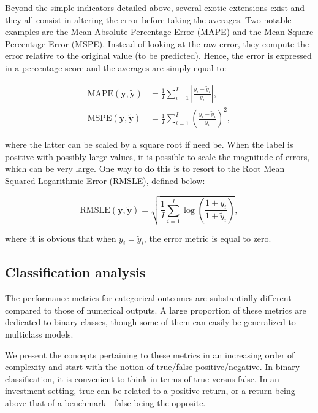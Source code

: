 \documentclass[]{krantz}
\theoremstyle{definition}
\theoremstyle{definition}
\theoremstyle{definition}
\theoremstyle{remark}
\begin{document}
Beyond the simple indicators detailed above, several exotic extensions
exist and they all consist in altering the error before taking the
averages. Two notable examples are the Mean Absolute Percentage Error
(MAPE) and the Mean Square Percentage Error (MSPE). Instead of looking
at the raw error, they compute the error relative to the original value
(to be predicted). Hence, the error is expressed in a percentage score
and the averages are simply equal to:

\begin{align} \label{eq:MAPE} 
\text{MAPE}(\textbf{y},\tilde{\textbf{y}})&=\frac{1}{I}\sum_{i=1}^I\left|\frac{y_i-\tilde{y}_i}{y_i}\right|,  \\ \label{eq:MSPE} 
\text{MSPE}(\textbf{y},\tilde{\textbf{y}})&=\frac{1}{I}\sum_{i=1}^I\left(\frac{y_i-\tilde{y}_i}{y_i}\right)^2,
\end{align}

where the latter can be scaled by a square root if need be. When the
label is positive with possibly large values, it is possible to scale
the magnitude of errors, which can be very large. One way to do this is
to resort to the Root Mean Squared Logarithmic Error (RMSLE), defined
below:

\begin{equation}
 \label{eq:RMSLE} 
\text{RMSLE}(\textbf{y},\tilde{\textbf{y}})=\sqrt{\frac{1}{I}\sum_{i=1}^I\log\left(\frac{1+y_i}{1+\tilde{y}_i}\right)}, 
\end{equation}

where it is obvious that when \(y_i=\tilde{y}_i\), the error metric is
equal to zero.

\hypertarget{classification-analysis}{%
\subsection{Classification analysis}\label{classification-analysis}}

The performance metrics for categorical outcomes are substantially
different compared to those of numerical outputs. A large proportion of
these metrics are dedicated to binary classes, though some of them can
easily be generalized to multiclass models.

We present the concepts pertaining to these metrics in an increasing
order of complexity and start with the notion of true/false
positive/negative. In binary classification, it is convenient to think
in terms of true versus false. In an investment setting, true can be
related to a positive return, or a return being above that of a
benchmark - false being the opposite.
\end{document}
